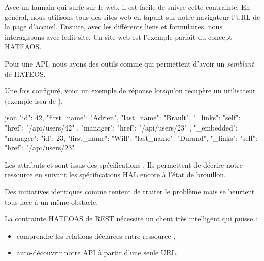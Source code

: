 \documentclass[big]{zmdocument}
\begin{document}
Avec un humain qui surfe sur le web, il est facile de suivre cette contrainte. En général, nous utilisons tous des sites web en tapant sur notre navigateur l'URL de la page d'accueil. Ensuite, avec les différents liens et formulaires, nous interagissons avec ledit site. Un site web est l'exemple parfait du concept HATEAOS.



Pour une API, nous avons des outils comme  qui permettent d'avoir un \textit{semblant} de HATEOS.



Une fois configuré, voici un exemple de réponse lorsqu'on récupère un utilisateur (exemple issu de ).



\begin{CodeBlock}{json}
{
    "id": 42,
    "first_name": "Adrien",
    "last_name": "Brault",
    "_links": {
        "self": {
            "href": "/api/users/42"
        },
        "manager": {
            "href": "/api/users/23"
        }
    },
    "_embedded": {
        "manager": {
            "id": 23,
            "first_name": "Will",
            "last_name": "Durand",
            "_links": {
                "self": {
                    "href": "/api/users/23"
                }
            }
        }
    }
}
\end{CodeBlock}



Les attributs  et  sont issus des spécifications . Ils permettent de décrire notre ressource en suivant les spécifications HAL encore à l'état de brouillon.



Des initiatives identiques comme  tentent de traiter le problème mais se heurtent tous face à un même obstacle.



La contrainte HATEOAS de REST nécessite un client très intelligent qui puisse :



\begin{itemize}
\item comprendre les relations déclarées entre ressource ;
\item auto-découvrir notre API à partir d'une seule URL.
\end{itemize}
\end{document}
